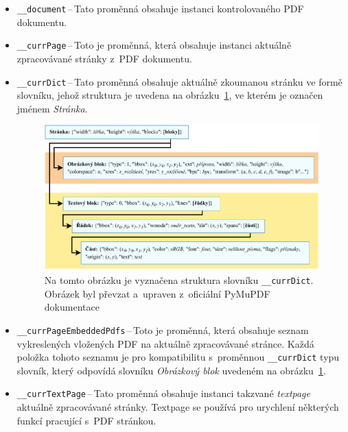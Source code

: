 \begin{itemize}
    \item \texttt{\_\_document}\,--\,Tato proměnná obsahuje instanci
    kontrolovaného PDF dokumentu.

    \item \texttt{\_\_currPage}\,--\,Toto je proměnná, která obsahuje instanci
    aktuálně zpracovávané strán\-ky z~PDF dokumentu.

    \item \texttt{\_\_currDict}\,--\,Tato proměnná obsahuje aktuálně
    zkoumanou stránku ve formě slovníku, jehož struktura je uvedena na
    obrázku~\ref{pic_curr_page_dict}, ve kterém je označen jménem \emph{Stránka}.
    \begin{figure}[H]
        \centering
        \includegraphics[width=\linewidth]{obrazky-figures/page_dictionary.pdf}
        \caption{
            Na tomto obrázku je vyznačena struktura slovníku \texttt{\_\_currDict}.
            Obrázek byl převzat a~upraven z~oficiální PyMuPDF 
            dokumentace~\cite[Cesta: \emph{TextPage}]{PyMuPDF} 
            }
        \label{pic_curr_page_dict}
    \end{figure}

    \item \texttt{\_\_currPageEmbeddedPdfs}\,--\,Toto je proměnná, která obsahuje
    seznam vykreslených vložených PDF na aktuálně zpracovávané stránce. Každá
    položka tohoto seznamu je pro kompatibilitu s~proměnnou \texttt{\_\_currDict}
    typu slovník, který odpovídá slovníku \emph{Obrázkový blok} uvedeném na
    obrázku~\ref{pic_curr_page_dict}. 
    
    \item \texttt{\_\_currTextPage}\,--\,Tato proměnná obsahuje instanci
    takzvané \emph{textpage} aktuálně zpracovávané stránky. Textpage se používá
    pro urychlení některých funkcí pracující s~PDF stránkou.
    

\end{itemize}
